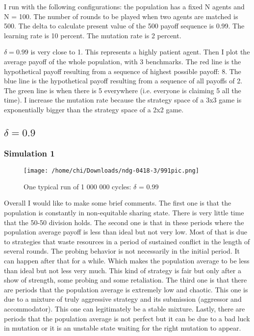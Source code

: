 \documentclass[12.5pt]{report}
\begin{document}
I run with the following configurations: the population has a fixed N agents and N = 100. The number of rounds to be played when two agents are matched is 500. The delta to calculate present value of the 500 payoff sequence is 0.99. The learning rate is 10 percent. The mutation rate is 2 percent.

$\delta = 0.99$ is very close to 1. This represents a highly patient agent. Then I plot the average payoff of the whole population, with 3 benchmarks. The red line is the hypothetical payoff resulting from a sequence of highest possible payoff: 8. The blue line is the hypothetical payoff resulting from a sequence of all payoffs of 2. The green line is when there is 5 everywhere (i.e. everyone is claiming 5 all the time). I increase the mutation rate because the strategy space of a 3x3 game is exponentially bigger than the strategy space of a 2x2 game.\\

\subsection{$\delta = 0.9$}

\subsubsection{Simulation 1}

\begin{figure}[h!]
\center
\texttt{[image: /home/chi/Downloads/ndg-0418-3/991pic.png]}
\caption{One typical run of 1 000 000 cycles: $\delta$ = 0.99}
\end{figure}

Overall I would like to make some brief comments. The first one is that the population is constantly in non-equitable sharing state. There is very little time that the 50-50 division holds. The second one is that in these periods where the population average payoff is less than ideal but not very low. Most of that is due to strategies that waste resources in a period of sustained conflict in the length of several rounds. The probing behavior is not necessarily in the initial period. It can happen after that for a while. Which makes the population average to be less than ideal but not less very much. This kind of strategy is fair but only after a show of strength, some probing and some retaliation. The third one is that there are periods that the population average is extremely low and chaotic. This one is due to a mixture of truly aggressive strategy and its submission (aggressor and accommodator). This one can legitimately be a stable mixture. Lastly, there are periods that the population average is not perfect but it can be due to a bad luck in mutation or it is an unstable state waiting for the right mutation to appear.\\
\end{document}
